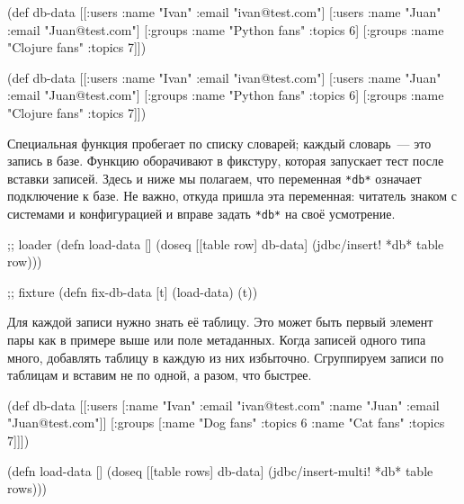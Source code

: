 \pagebreaklarge

\ifnarrow

\begin{english}
  \begin{clojure}
(def db-data
 [[:users {:name "Ivan"
           :email "ivan@test.com"}]
  [:users {:name "Juan"
           :email "Juan@test.com"}]
  [:groups {:name "Python fans"
            :topics 6}]
  [:groups {:name "Clojure fans"
            :topics 7}]])
  \end{clojure}
\end{english}

\else

\begin{english}
  \begin{clojure}
(def db-data
  [[:users {:name "Ivan" :email "ivan@test.com"}]
   [:users {:name "Juan" :email "Juan@test.com"}]
   [:groups {:name "Python fans" :topics 6}]
   [:groups {:name "Clojure fans" :topics 7}]])
  \end{clojure}
\end{english}

\fi


Специальная функция пробегает по списку словарей; каждый словарь~--- это запись
в базе. Функцию оборачивают в фикстуру, которая запускает тест после вставки
записей. Здесь и ниже мы полагаем, что переменная \verb|*db*| означает
подключение к базе. Не важно, откуда пришла эта переменная: читатель знаком с
системами и конфигурацией и вправе задать \verb|*db*| на своё усмотрение.

\begin{english}
  \begin{clojure}
;; loader
(defn load-data []
  (doseq [[table row] db-data]
    (jdbc/insert! *db* table row)))

;; fixture
(defn fix-db-data [t]
  (load-data)
  (t))
  \end{clojure}
\end{english}

Для каждой записи нужно знать её таблицу. Это может быть первый элемент пары
 как в примере выше или поле метаданных. Когда записей
одного типа много, добавлять таблицу в каждую из них избыточно. Сгруппируем
записи по таблицам и вставим не по одной, а разом, что быстрее.


\ifnarrow

\begin{english}
  \begin{clojure}
(def db-data
  [[:users [{:name "Ivan"
             :email "ivan@test.com"}
            {:name "Juan"
             :email "Juan@test.com"}]]
  [:groups [{:name "Dog fans"
             :topics 6}
            {:name "Cat fans"
             :topics 7}]]])

(defn load-data []
 (doseq [[table rows] db-data]
  (jdbc/insert-multi! *db* table rows)))
  \end{clojure}
\end{english}

